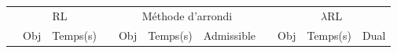 \vspace*{1.2cm}

\begin{landscape}

\begin{table*}[h!]\centering
{}
\begin{tabular}{@{}rrrcrrrcrrr@{}}\toprule
& \multicolumn{2}{c}{RL} & \phantom{abc} & \multicolumn{3}{c}{Méthode d'arrondi} & \phantom{abc} & \multicolumn{3}{c}{$\lambda$RL}\\
\cmidrule{2-3} \cmidrule{5-7} \cmidrule{9-11}
& Obj & Temps(s) & & Obj & Temps(s) & Admissible & & Obj & Temps(s) & Dual\\ \midrule


\end{tabular}
\end{table*}
\end{landscape}
